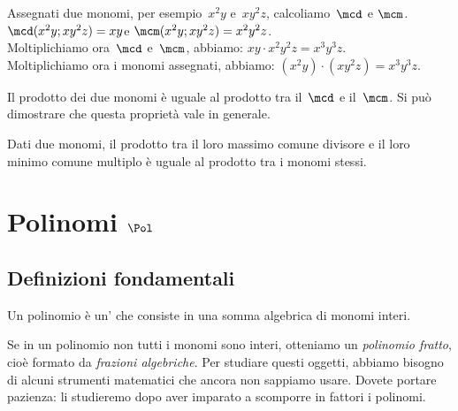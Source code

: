 Assegnati due monomi, per esempio~\(x^{2}y\) e~\(xy^{2}z\),
calcoliamo~\(\mcd\) e \(\mcm\).\\
\hspace*{\fill}\(\mcd (x^{2}y;xy^{2}z)=xy\)\quad e \quad 
\(\mcm (x^{2}y;xy^{2}z)=x^{2}y^{2}z\).\hspace*{\fill}\\
Moltiplichiamo ora~\(\mcd\) e~\(\mcm\), abbiamo: \quad 
\(xy\cdot x^{2}y^{2}z = x^{3}y^{3}z.\)\\
Moltiplichiamo ora i monomi assegnati, abbiamo: \quad 
\((x^{2}y) \cdot (xy^{2}z)=x^{3}y^{3}z\).

Il prodotto dei due monomi è 
uguale al prodotto tra il~\(\mcd\) e il~\(\mcm\). 
Si può dimostrare che questa proprietà vale in generale.

\begin{teorema}{}{}
Dati due monomi, il prodotto tra il loro massimo comune
divisore e il loro minimo comune multiplo è uguale al prodotto tra i
monomi stessi.
\end{teorema}


\section{Polinomi $\Pol$}
\label{subsec:poli_polinomi}

\subsection{Definizioni fondamentali}
\label{subsec:poli_definizioni}

\begin{definizione}{}{}
Un polinomio è un' che consiste in una somma algebrica di monomi interi.
\end{definizione}

\begin{osservazione}{}{}
Se in un polinomio non tutti i monomi sono interi, otteniamo un 
\emph{polinomio fratto}, 
cioè formato da \emph{frazioni algebriche}.
Per studiare questi oggetti, abbiamo bisogno di alcuni strumenti 
matematici che ancora non sappiamo usare. 
Dovete portare pazienza: li studieremo dopo aver imparato a scomporre 
in fattori i polinomi.
\end{osservazione}


